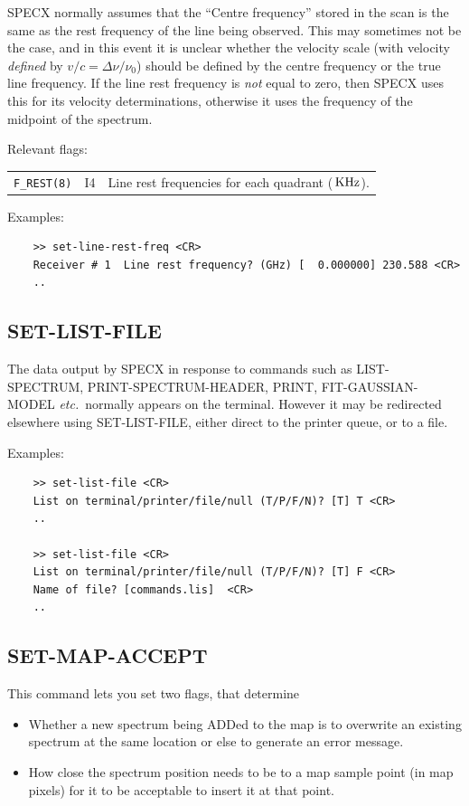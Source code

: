 \documentclass[11pt,twoside]{report}
\newcommand{\etc}{{\it etc.\,}}
\newcommand{\khz}{{\rm\,KHz}}
\begin{document}
SPECX normally assumes that the ``Centre frequency'' stored in the scan
is the same as the rest frequency of the line being observed. This may
sometimes not be the case, and in this event it is unclear whether the
velocity scale (with velocity {\em defined} by $v/c = \Delta\nu/\nu_0$)
should be defined by the centre frequency or the true line frequency.
If the line rest frequency is {\em not} equal to zero, then SPECX uses
this for its velocity determinations, otherwise it uses the frequency
of the midpoint of the spectrum.

Relevant flags:\\
\begin{tabular}{lll}
  \verb+F_REST(8)+ & I4 & Line rest frequencies for each quadrant ($\khz$).
\end{tabular}

Examples:
\begin{verbatim}
    >> set-line-rest-freq <CR>
    Receiver # 1  Line rest frequency? (GHz) [  0.000000] 230.588 <CR>
    ..
\end{verbatim}

\subsection{SET-LIST-FILE} 

The data output by SPECX in response to commands such as LIST-SPECTRUM,
PRINT-SPECTRUM-HEADER, PRINT, FIT-GAUSSIAN-MODEL \etc
normally appears on the terminal. However it may be
redirected elsewhere using SET-LIST-FILE, either direct to the printer queue,
or to a file.

Examples:
\begin{verbatim}
    >> set-list-file <CR>
    List on terminal/printer/file/null (T/P/F/N)? [T] T <CR>
    ..

    >> set-list-file <CR>
    List on terminal/printer/file/null (T/P/F/N)? [T] F <CR>
    Name of file? [commands.lis]  <CR>
    ..
\end{verbatim}

\subsection{SET-MAP-ACCEPT} 

This command lets you set two flags, that determine
\begin{itemize}
\item Whether a new spectrum being ADDed to the map is to overwrite an
      existing spectrum at the same location or else to generate an
      error message.
\item How close the spectrum position needs to be to a map sample point
      (in map pixels) for it to be acceptable to insert it at that point.
\end{itemize}
\end{document}
